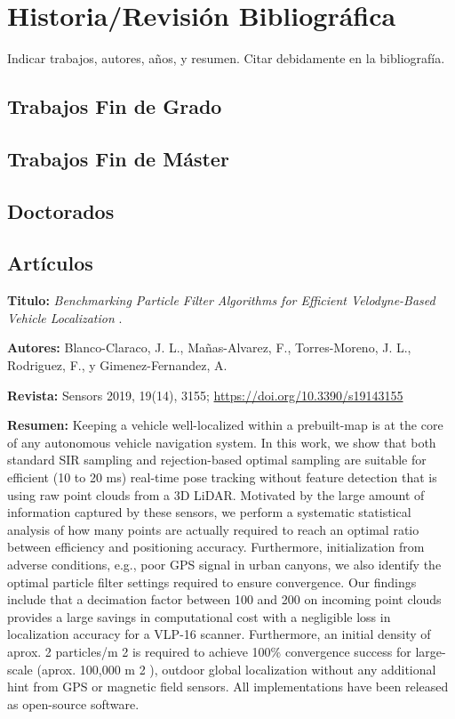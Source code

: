 \chapter{Historia/Revisión Bibliográfica}
Indicar trabajos, autores, años, y resumen. Citar debidamente en la bibliografía.
\section{Trabajos Fin de Grado}

\section{Trabajos Fin de Máster}

\section{Doctorados}

\section{Artículos}
\textbf{Titulo:} \textit{Benchmarking Particle Filter Algorithms for Efficient Velodyne-Based Vehicle Localization} \cite{blanco2019benchmarking}.

\textbf{Autores:} Blanco-Claraco, J. L., Mañas-Alvarez, F., Torres-Moreno, J. L., Rodriguez, F., y Gimenez-Fernandez, A.

\textbf{Revista:} Sensors 2019, 19(14), 3155; \url{https://doi.org/10.3390/s19143155}

\textbf{Resumen:} Keeping a vehicle well-localized within a prebuilt-map is at the core of any autonomous vehicle navigation system. In this work, we show that both standard SIR sampling and rejection-based optimal sampling are suitable for efficient (10 to 20 ms) real-time pose tracking without feature detection that is using raw point clouds from a 3D LiDAR. Motivated by the large amount of information captured by these sensors, we perform a systematic statistical analysis of how many points are actually required to reach an optimal ratio between efficiency and positioning accuracy. Furthermore, initialization from adverse conditions, e.g., poor GPS signal in urban canyons, we also identify the optimal particle filter settings required to ensure convergence. Our findings include that a decimation factor between 100 and 200 on incoming point clouds provides a large savings in computational cost with a negligible loss in localization accuracy for a VLP-16 scanner. Furthermore, an initial density of aprox. 2 particles/m 2 is required to achieve 100\% convergence success for large-scale (aprox. 100,000 m 2 ), outdoor global localization without any additional hint from GPS or magnetic field sensors. All implementations have been released as open-source software.

